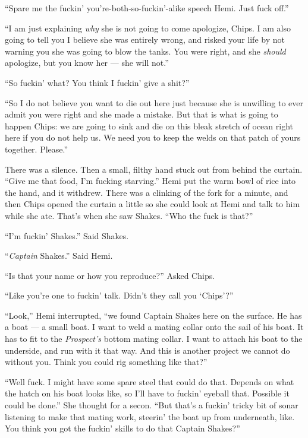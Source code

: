 \documentclass[]{scrbook}
\begin{document}
``Spare me the fuckin' you're-both-so-fuckin'-alike speech Hemi. Just
fuck off.''

``I am just explaining \emph{why} she is not going to come apologize,
Chips. I am also going to tell you I believe she was entirely wrong, and
risked your life by not warning you she was going to blow the tanks. You
were right, and she \emph{should} apologize, but you know her --- she
will not.''

``So fuckin' what? You think I fuckin' give a shit?''

``So I do not believe you want to die out here just because she is
unwilling to ever admit you were right and she made a mistake. But that
is what is going to happen Chips: we are going to sink and die on this
bleak stretch of ocean right here if you do not help us. We need you to
keep the welds on that patch of yours together. Please.''

There was a silence. Then a small, filthy hand stuck out from behind the
curtain. ``Give me that food, I'm fucking starving.'' Hemi put the warm
bowl of rice into the hand, and it withdrew. There was a clinking of the
fork for a minute, and then Chips opened the curtain a little so she
could look at Hemi and talk to him while she ate. That's when she saw
Shakes. ``Who the fuck is that?''

``I'm fuckin' Shakes.'' Said Shakes.

``\emph{Captain} Shakes.'' Said Hemi.

``Is that your name or how you reproduce?'' Asked Chips.

``Like you're one to fuckin' talk. Didn't they call you `Chips'?''

``Look,'' Hemi interrupted, ``we found Captain Shakes here on the
surface. He has a boat --- a small boat. I want to weld a mating collar
onto the sail of his boat. It has to fit to the \emph{Prospect's} bottom
mating collar. I want to attach his boat to the underside, and run with
it that way. And this is another project we cannot do without you. Think
you could rig something like that?''

``Well fuck. I might have some spare steel that could do that. Depends
on what the hatch on his boat looks like, so I'll have to fuckin'
eyeball that. Possible it could be done.'' She thought for a secon.
``But that's a fuckin' tricky bit of sonar listening to make that mating
work, steerin' the boat up from underneath, like. You think you got the
fuckin' skills to do that Captain Shakes?''
\end{document}
